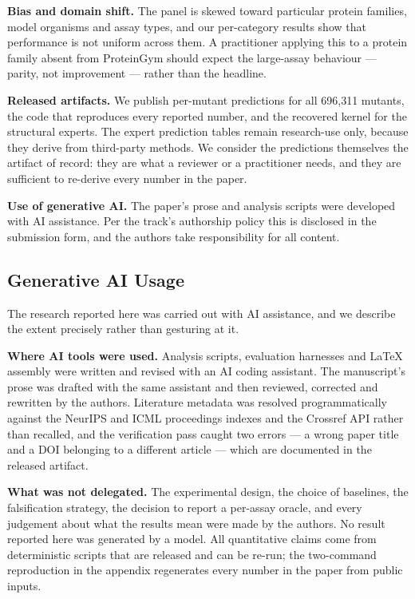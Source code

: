 \documentclass[sigconf,review,nonacm]{acmart}
\begin{document}
\textbf{Bias and domain shift.} The panel is skewed toward particular protein families, model organisms and
assay types, and our per-category results show that performance is not uniform across them. A
practitioner applying this to a protein family absent from ProteinGym should expect the large-assay
behaviour --- parity, not improvement --- rather than the headline.

\textbf{Released artifacts.} We publish per-mutant predictions for all 696,311 mutants, the code that
reproduces every reported number, and the recovered kernel for the structural experts. The expert
prediction tables remain research-use only, because they derive from third-party methods. We consider
the predictions themselves the artifact of record: they are what a reviewer or a practitioner needs,
and they are sufficient to re-derive every number in the paper.

\textbf{Use of generative AI.} The paper's prose and analysis scripts were developed with AI assistance.
Per the track's authorship policy this is disclosed in the submission form, and the authors take
responsibility for all content.

\subsection{Generative AI Usage}\label{generative-ai-usage}

The research reported here was carried out with AI assistance, and we describe the extent precisely
rather than gesturing at it.

\textbf{Where AI tools were used.} Analysis scripts, evaluation harnesses and LaTeX assembly were written and
revised with an AI coding assistant. The manuscript's prose was drafted with the same assistant and
then reviewed, corrected and rewritten by the authors. Literature metadata was resolved programmatically
against the NeurIPS and ICML proceedings indexes and the Crossref API rather than recalled, and the
verification pass caught two errors --- a wrong paper title and a DOI belonging to a different article ---
which are documented in the released artifact.

\textbf{What was not delegated.} The experimental design, the choice of baselines, the falsification
strategy, the decision to report a per-assay oracle, and every judgement about what the results mean
were made by the authors. No result reported here was generated by a model. All quantitative claims
come from deterministic scripts that are released and can be re-run; the two-command reproduction in the
appendix regenerates every number in the paper from public inputs.
\end{document}
